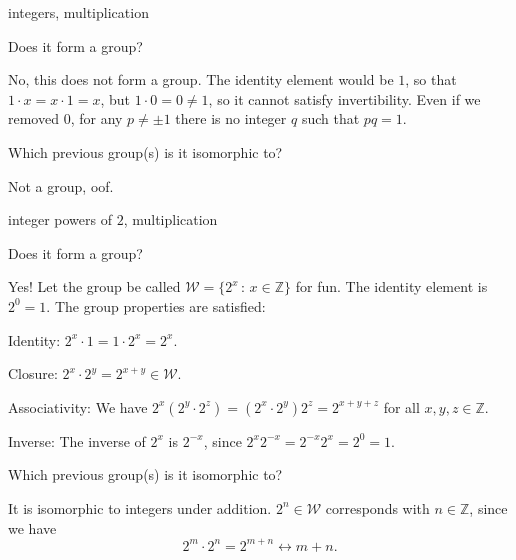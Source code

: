 \documentclass[../key.tex]{subfiles}
\begin{document}
\begin{inner_problem}
\item integers, multiplication
\end{inner_problem}

\begin{iinner_problem}[start=1]
\item Does it form a group?
\end{iinner_problem}

\noindent No, this does not form a group. The identity element would be $1$, so that $1\cdot x = x\cdot 1 = x$, but $1\cdot 0 = 0\neq 1$, so it cannot satisfy invertibility. Even if we removed $0$, for any $p\neq \pm 1$ there is no integer $q$ such that $pq=1$.

\begin{iinner_problem}
\item Which previous group(s) is it isomorphic to?
\end{iinner_problem}

\noindent Not a group, oof.

\begin{inner_problem}
\item integer powers of $2$, multiplication
\end{inner_problem}

\begin{iinner_problem}[start=1]
\item Does it form a group?
\end{iinner_problem}

\noindent Yes! Let the group be called $\mathcal{W}=\{2^x\, :\, x\in \mathbb{Z}\}$ for fun. The identity element is $2^0=1$. The group properties are satisfied:

Identity: $2^x\cdot 1=1\cdot 2^x=2^x$.

Closure: $2^x\cdot 2^y = 2^{x+y} \in \mathcal{W}$.

Associativity: We have $2^{x}(2^{y}\cdot 2^{z})=(2^{x}\cdot 2^{y})2^{z}=2^{x+y+z}$ for all $x,y,z \in \mathbb{Z}$.

Inverse: The inverse of $2^x$ is $2^{-x}$, since $2^{x}2^{-x}=2^{-x}2^{x}=2^0=1$.

\begin{iinner_problem}
\item Which previous group(s) is it isomorphic to?
\end{iinner_problem}

\noindent It is isomorphic to integers under addition. $2^n\in \mathcal{W}$ corresponds with $n\in \mathbb{Z}$, since we have $$2^m\cdot 2^n=2^{m+n}\leftrightarrow m+n.$$
\end{document}
